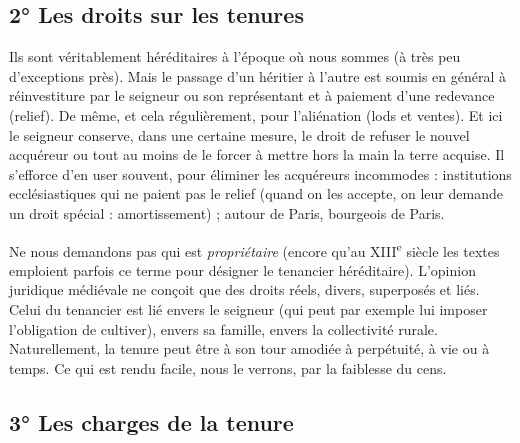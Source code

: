 \documentclass[french,twoside]{book} %
\begin{document}
\subsection[2° Les droits sur les tenures]{2° Les droits sur les tenures}
\noindent Ils sont véritablement héréditaires à l’époque où nous sommes (à très peu d’exceptions près). Mais le passage d’un héritier à l’autre est soumis en général à réinvestiture par le seigneur ou son représentant et à paiement d’une redevance (relief). De même, et cela régulièrement, pour l’aliénation (lods et ventes). Et ici le seigneur conserve, dans une certaine mesure, le droit de refuser le nouvel acquéreur ou tout au moins de le forcer à mettre hors la main la terre acquise. Il s’efforce d’en user souvent, pour éliminer les acquéreurs incommodes : institutions ecclésiastiques qui ne paient pas le relief (quand on les accepte, on leur demande un droit spécial : amortissement) ; autour de Paris, bourgeois de Paris.\par
Ne nous demandons pas qui est \emph{propriétaire} (encore qu’au XIII\textsuperscript{e} siècle les textes emploient parfois ce terme pour désigner le tenancier héréditaire). L’opinion juridique médiévale ne conçoit que des droits réels, divers, superposés et liés. Celui du tenancier est lié envers le seigneur (qui peut par exemple lui imposer l’obligation de cultiver), envers sa famille, envers la collectivité rurale. Naturellement, la tenure peut être à son tour amodiée à perpétuité, à vie ou à temps. Ce qui est rendu facile, nous le verrons, par la faiblesse du cens.
\subsection[3° Les charges de la tenure]{3° Les charges de la tenure}
\end{document}
